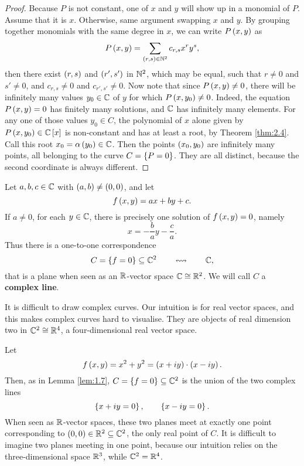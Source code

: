 \begin{proof}
Because $ P $ is not constant, one of $ x $ and $ y $ will show up in a monomial of $ P $. Assume that it is $ x $. Otherwise, same argument swapping $ x $ and $ y $. By grouping together monomials with the same degree in $ x $, we can write $ P\left( x, y \right) $ as
$$ P\left( x, y \right) = \sum_{\left( r, s \right) \in \mathbb{N}^2} c_{r, s}x^ry^s, $$
then there exist $ \left( r, s \right) $ and $ \left( r', s' \right) $ in $ \mathbb{N}^2 $, which may be equal, such that $ r \ne 0 $ and $ s' \ne 0 $, and $ c_{r, s} \ne 0 $ and $ c_{r', s'} \ne 0 $. Now note that since $ P\left( x, y \right) \ne 0 $, there will be infinitely many values $ y_0 \in \mathbb{C} $ of $ y $ for which $ P\left( x, y_0 \right) \ne 0 $. Indeed, the equation $ P\left( x, y \right) = 0 $ has finitely many solutions, and $ \mathbb{C} $ has infinitely many elements. For any one of those values $ y_0 \in C $, the polynomial of $ x $ alone given by $ P\left( x, y_0 \right) \in \mathbb{C}\left[ x \right] $ is non-constant and has at least a root, by Theorem \ref{thm:2.4}. Call this root $ x_0 = \alpha\left( y_0 \right) \in \mathbb{C} $. Then the points $ \left( x_0, y_0 \right) $ are infinitely many points, all belonging to the curve $ C = \left\{ P = 0 \right\} $. They are all distinct, because the second coordinate is always different.
\end{proof}

\begin{example}
Let $ a, b, c \in \mathbb{C} $ with $ \left( a, b \right) \ne \left( 0, 0 \right) $, and let
$$ f\left( x, y \right) = ax + by + c. $$
If $ a \ne 0 $, for each $ y \in \mathbb{C} $, there is precisely one solution of $ f\left( x, y \right) = 0 $, namely
$$ x = -\dfrac{b}{a}y - \dfrac{c}{a}. $$
Thus there is a one-to-one correspondence
$$ C = \left\{ f = 0 \right\} \subseteq \mathbb{C}^2 \qquad \leftrightsquigarrow \qquad \mathbb{C}, $$
that is a plane when seen as an $ \mathbb{R} $-vector space $ \mathbb{C} \cong \mathbb{R}^2 $. We will call $ C $ a \textbf{complex line}.
\end{example}

\begin{remark}
It is difficult to draw complex curves. Our intuition is for real vector spaces, and this makes complex curves hard to visualise. They are objects of real dimension two in $ \mathbb{C}^2 \cong \mathbb{R}^4 $, a four-dimensional real vector space.
\end{remark}

\begin{example}
Let
$$ f\left( x, y \right) = x^2 + y^2 = \left( x + iy \right) \cdot \left( x - iy \right). $$
Then, as in Lemma \ref{lem:1.7}, $ C = \left\{ f = 0 \right\} \subseteq \mathbb{C}^2 $ is the union of the two complex lines
$$ \left\{ x + iy = 0 \right\}, \qquad \left\{ x - iy = 0 \right\}. $$
When seen as $ \mathbb{R} $-vector spaces, these two planes meet at exactly one point corresponding to $ \left( 0, 0 \right) \in \mathbb{R}^2 \subseteq \mathbb{C}^2 $, the only real point of $ C $. It is difficult to imagine two planes meeting in one point, because our intuition relies on the three-dimensional space $ \mathbb{R}^3 $, while $ \mathbb{C}^2 = \mathbb{R}^4 $.
\end{example}

